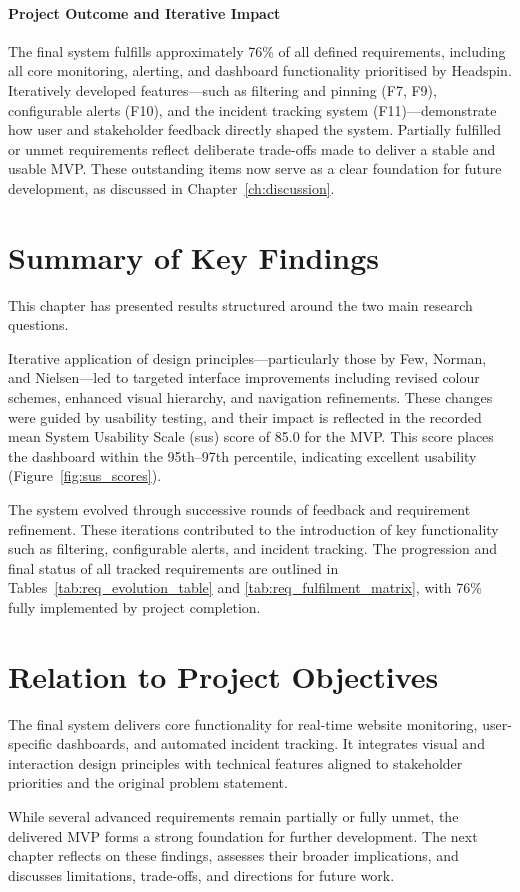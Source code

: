 \paragraph{Project Outcome and Iterative Impact}
The final system fulfills approximately 76\% of all defined requirements, including all core monitoring, alerting, and dashboard functionality prioritised by Headspin. Iteratively developed features—such as filtering and pinning (F7, F9), configurable alerts (F10), and the incident tracking system (F11)—demonstrate how user and stakeholder feedback directly shaped the system. Partially fulfilled or unmet requirements reflect deliberate trade-offs made to deliver a stable and usable MVP. These outstanding items now serve as a clear foundation for future development, as discussed in Chapter~\ref{ch:discussion}.



\section{Summary of Key Findings}
This chapter has presented results structured around the two main research questions.

Iterative application of design principles—particularly those by Few, Norman, and Nielsen—led to targeted interface improvements including revised colour schemes, enhanced visual hierarchy, and navigation refinements. These changes were guided by usability testing, and their impact is reflected in the recorded mean System Usability Scale (\acrshort{sus}) score of 85.0 for the MVP. This score places the dashboard within the 95th–97th percentile, indicating excellent usability (Figure~\ref{fig:sus_scores}).

The system evolved through successive rounds of feedback and requirement refinement. These iterations contributed to the introduction of key functionality such as filtering, configurable alerts, and incident tracking. The progression and final status of all tracked requirements are outlined in Tables~\ref{tab:req_evolution_table} and \ref{tab:req_fulfilment_matrix}, with 76\% fully implemented by project completion.

\section{Relation to Project Objectives}
The final system delivers core functionality for real-time website monitoring, user-specific dashboards, and automated incident tracking. It integrates visual and interaction design principles with technical features aligned to stakeholder priorities and the original problem statement.

While several advanced requirements remain partially or fully unmet, the delivered MVP forms a strong foundation for further development. The next chapter reflects on these findings, assesses their broader implications, and discusses limitations, trade-offs, and directions for future work.

